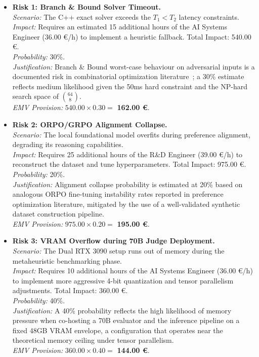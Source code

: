 \begin{itemize}
    \item \textbf{Risk 1: Branch \& Bound Solver Timeout.} \\
    \textit{Scenario:} The C++ exact solver exceeds the $T_1 < T_2$ latency constraints. \\
    \textit{Impact:} Requires an estimated 15 additional hours of the AI Systems Engineer (36.00 \euro/h) to implement a heuristic fallback. Total Impact: 540.00 \euro. \\
    \textit{Probability:} 30\%. \\
    \textit{Justification:} Branch \& Bound worst-case behaviour on adversarial
inputs is a documented risk in combinatorial optimization
literature~\cite{pmbok_guide}; a 30\% estimate reflects medium likelihood
given the 50ms hard constraint and the NP-hard search space of $\binom{64}{8}$. \\
    \textit{EMV Provision:} $540.00 \times 0.30 =$ \textbf{162.00 \euro}.

    \item \textbf{Risk 2: ORPO/GRPO Alignment Collapse.} \\
    \textit{Scenario:} The local foundational model overfits during preference alignment, degrading its reasoning capabilities. \\
    \textit{Impact:} Requires 25 additional hours of the R\&D Engineer (39.00 \euro/h) to reconstruct the dataset and tune hyperparameters. Total Impact: 975.00 \euro. \\
    \textit{Probability:} 20\%. \\
    \textit{Justification:} Alignment collapse probability is estimated at 20\%
based on analogous ORPO fine-tuning instability rates reported in
preference optimization literature, mitigated by the use of a well-validated
synthetic dataset construction pipeline. \\
    \textit{EMV Provision:} $975.00 \times 0.20 =$ \textbf{195.00 \euro}.

    \item \textbf{Risk 3: VRAM Overflow during 70B Judge Deployment.} \\
    \textit{Scenario:} The Dual RTX 3090 setup runs out of memory during the metaheuristic benchmarking phase. \\
    \textit{Impact:} Requires 10 additional hours of the AI Systems Engineer (36.00 \euro/h) to implement more aggressive 4-bit quantization and tensor parallelism adjustments. Total Impact: 360.00 \euro. \\
    \textit{Probability:} 40\%. \\
    \textit{Justification:} A 40\% probability reflects the high likelihood of
memory pressure when co-hosting a 70B evaluator and the inference pipeline
on a fixed 48GB VRAM envelope, a configuration that operates near the
theoretical memory ceiling under tensor parallelism. \\
    \textit{EMV Provision:} $360.00 \times 0.40 =$ \textbf{144.00 \euro}.
\end{itemize}


